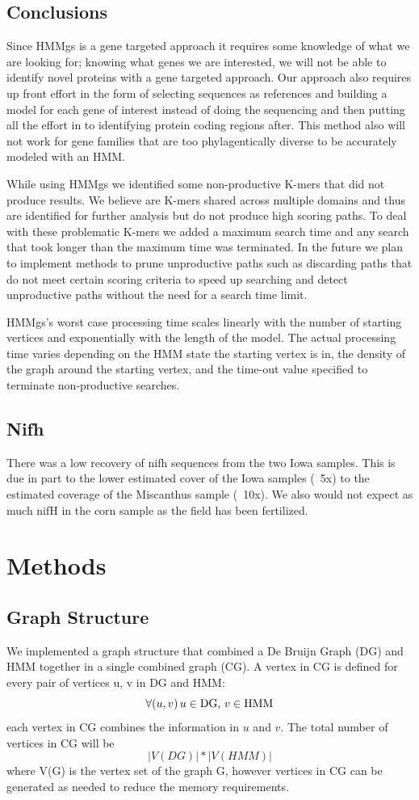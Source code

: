 \documentclass[10pt]{bmc_article}
\newenvironment{bmcformat}{\begin{raggedright}\baselineskip20pt\sloppy\setboolean{publ}{false}}{\end{raggedright}\baselineskip20pt\sloppy}
\begin{document}
\begin{bmcformat}
\subsection*{Conclusions}
Since HMMgs is a gene targeted approach it requires some knowledge of what we are looking for; knowing what genes we are interested, we will not be able to identify novel proteins with a gene targeted approach.  Our approach also requires up front effort in the form of selecting sequences as references and building a model for each gene of interest instead of doing the sequencing and then putting all the effort in to identifying protein coding regions after.  This method also will not work for gene families that are too phylagentically diverse to be accurately modeled with an HMM.

While using HMMgs we identified some non-productive K-mers that did not produce results. We believe are K-mers shared across multiple domains and thus are identified for further analysis but do not produce high scoring paths.  To deal with these problematic K-mers we added a maximum search time and any search that took longer than the maximum time was terminated.  In the future we plan to implement methods to prune unproductive paths such as discarding paths that do not meet certain scoring criteria to speed up searching and detect unproductive paths without the need for a search time limit.

HMMgs's worst case processing time scales linearly with the number of starting vertices and exponentially with the length of the model.  The actual processing time varies depending on the HMM state the starting vertex is in, the density of the graph around the starting vertex, and the time-out value specified to terminate non-productive searches.
\subsection*{Nifh}
There was a low recovery of nifh sequences from the two Iowa samples.  This is due in part to the lower estimated cover of the Iowa samples (~5x) to the estimated coverage of the Miscanthus sample (~10x).  We also would not expect as much nifH in the corn sample as the field has been fertilized.


  
\section*{Methods}
\subsection*{Graph Structure}
We implemented a graph structure that combined a De Bruijn Graph (DG) and HMM together in a single combined graph (CG).  A vertex in CG is defined for every pair of vertices u, v in DG and HMM:
\[ \forall (u,v)\, u\in \textnormal{DG, }v\in \textnormal{HMM} \] each vertex in CG combines the information in $u$ and $v$.
The total number of vertices in CG will be \[|V(DG)| * |V(HMM)|\] where V(G) is the vertex set of the graph G, however vertices in CG can be generated as needed to reduce the memory requirements.


\end{bmcformat}
\end{document}
